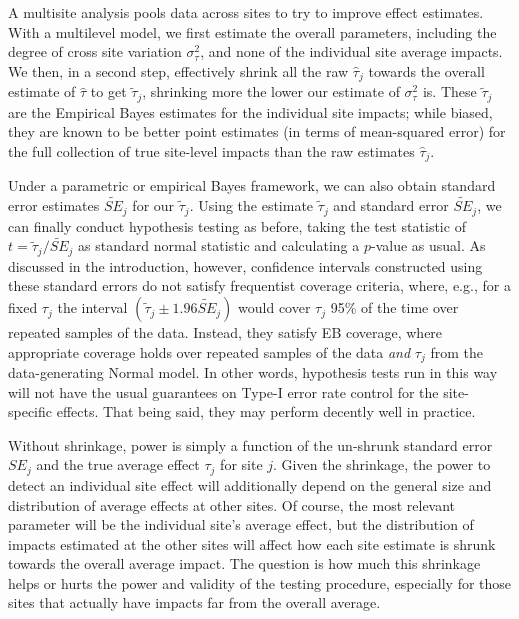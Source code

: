 \documentclass[]{article}
\begin{document}
A multisite analysis pools data across sites to try to improve effect estimates.
With a multilevel model, we first estimate the overall parameters, including the degree of cross site variation $\sigma^2_\tau$, and none of the individual site average impacts.
We then, in a second step, effectively shrink all the raw $\hat{\tau}_j$ towards the overall estimate of $\hat{\tau}$ to get $\tilde{\tau}_j$, shrinking more the lower our estimate of $\sigma^2_\tau$ is.
These $\tilde{\tau}_j$ are the Empirical Bayes estimates for the individual site impacts; while biased, they are known to be better point estimates (in terms of mean-squared error) for the full collection of true site-level impacts than the raw estimates $\hat{\tau}_j$.

Under a parametric or empirical Bayes framework, we can also obtain standard error estimates $\tilde{SE}_j$ for our $\tilde{\tau}_j$.
Using the estimate $\tilde{\tau}_j$ and standard error $\tilde{SE}_j$, we can finally conduct hypothesis testing as before, taking the test statistic of $t = \tilde{\tau}_j / \tilde{SE}_j$ as standard normal statistic and calculating a $p$-value as usual.
As discussed in the introduction, however, confidence intervals constructed using these standard errors do not satisfy frequentist coverage criteria, where, e.g., for a fixed $\tau_j$ the interval $(\tilde{\tau}_j \pm 1.96 \tilde{SE}_j)$ would cover $\tau_j$ 95\% of the time over repeated samples of the data.
Instead, they satisfy EB coverage, where appropriate coverage holds over repeated samples of the data \textit{and} $\tau_j$ from the data-generating Normal model.
In other words, hypothesis tests run in this way will not have the usual guarantees on Type-I error rate control for the site-specific effects.
That being said, they may perform decently well in practice.

Without shrinkage, power is simply a function of the un-shrunk standard error $SE_j$ and the true average effect $\tau_j$ for site $j$.
Given the shrinkage, the power to detect an individual site effect will additionally depend on the general size and distribution of average effects at other sites.
Of course, the most relevant parameter will be the individual site's average effect, but the distribution of impacts estimated at the other sites will affect how each site estimate is shrunk towards the overall average impact.
The question is how much this shrinkage helps or hurts the power and validity of the testing procedure, especially for those sites that actually have impacts far from the overall average.
\end{document}
